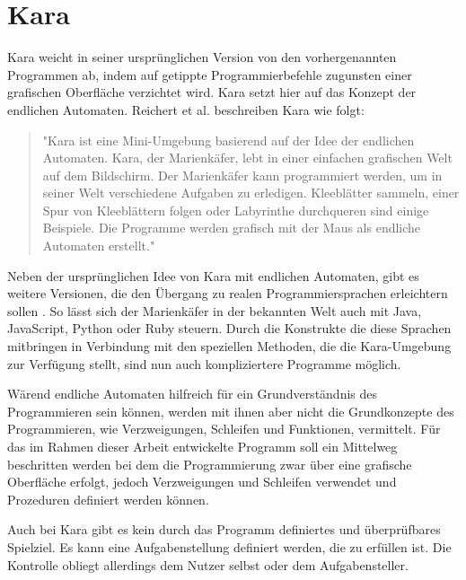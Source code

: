 \section{Kara}
\label{sec:related:kara}

Kara weicht in seiner ursprünglichen Version von den vorhergenannten Programmen ab, indem auf getippte Programmierbefehle zugunsten einer grafischen Oberfläche verzichtet wird. Kara setzt hier auf das Konzept der endlichen Automaten. Reichert et al. beschreiben Kara wie folgt:

\begin{quote}
    "Kara ist eine Mini-Umgebung basierend auf der Idee der endlichen Automaten. Kara, der Marienkäfer, lebt in einer einfachen grafischen Welt auf dem Bildschirm. Der Marienkäfer kann programmiert werden, um in seiner Welt verschiedene Aufgaben zu erledigen. Kleeblätter sammeln, einer Spur von Kleeblättern folgen oder Labyrinthe durchqueren sind einige Beispiele. Die Programme werden grafisch mit der Maus als endliche Automaten erstellt."~\cite[28]{reichert2004}
\end{quote}

Neben der ursprünglichen Idee von Kara mit endlichen Automaten, gibt es weitere Versionen, die den Übergang zu realen Programmiersprachen erleichtern sollen \cite{kara2017}. So lässt sich der Marienkäfer in der bekannten Welt auch mit Java, JavaScript, Python oder Ruby steuern. Durch die Konstrukte die diese Sprachen mitbringen in Verbindung mit den speziellen Methoden, die die Kara-Umgebung zur Verfügung stellt, sind nun auch kompliziertere Programme möglich.

Wärend endliche Automaten hilfreich für ein Grundverständnis des Programmieren sein können, werden mit ihnen aber nicht die Grundkonzepte des Programmieren, wie Verzweigungen, Schleifen und Funktionen, vermittelt. Für das im Rahmen dieser Arbeit entwickelte Programm soll ein Mittelweg beschritten werden bei dem die Programmierung zwar über eine grafische Oberfläche erfolgt, jedoch Verzweigungen und Schleifen verwendet und Prozeduren definiert werden können.

Auch bei Kara gibt es kein durch das Programm definiertes und überprüfbares Spielziel. Es kann eine Aufgabenstellung definiert werden, die zu erfüllen ist. Die Kontrolle obliegt allerdings dem Nutzer selbst oder dem Aufgabensteller.

